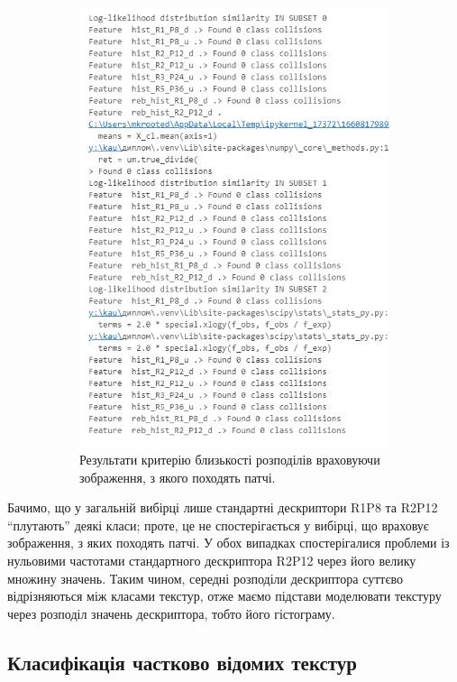 \begin{figure}[h]
\begin{subfigure}{0.48\textwidth}
    \includegraphics[width=0.9\linewidth]{img/distr-sim-subsets.png}
    \caption{
        Результати критерію близькості розподілів враховуючи зображення, з якого походять патчі. 
    }
    \label{subfig:distr-sim-subsets}
    \end{subfigure}
    
    \caption{}
    \label{fig:distr-sim}
\end{figure}

Бачимо, що у загальній вибірці лише стандартні дескриптори R1P8 та R2P12 ``плутають'' деякі класи; 
проте, це не спостерігається у вибірці, що враховує зображення, з яких походять патчі.
У обох випадках спостерігалися проблеми із нульовими частотами стандартного дескриптора R2P12 через його велику множину значень.
Таким чином, середні розподіли дескриптора суттєво відрізняються між класами текстур, 
отже маємо підстави моделювати текстуру через розподіл значень дескриптора, тобто його гістограму. 


\subsection{Класифікація частково відомих текстур}\label{section2.1d}\hfill

